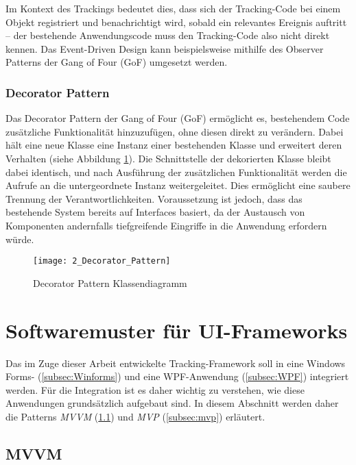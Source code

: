 Im Kontext des Trackings bedeutet dies, dass sich der Tracking-Code bei einem Objekt registriert und benachrichtigt wird, sobald ein relevantes Ereignis auftritt – der bestehende Anwendungscode muss den Tracking-Code also nicht direkt kennen. Das Event-Driven Design kann beispielsweise mithilfe des Observer Patterns der Gang of Four (GoF) \cite{gamma1995design} umgesetzt werden.

\subsubsection{Decorator Pattern}
\label{subsubsec:decorator_pattern}
Das Decorator Pattern der Gang of Four (GoF) \cite{gamma1995design} ermöglicht es, bestehendem Code zusätzliche Funktionalität hinzuzufügen, ohne diesen direkt zu verändern.  
Dabei hält eine neue Klasse eine Instanz einer bestehenden Klasse und erweitert deren Verhalten (siehe Abbildung \ref{fig:decorator_pattern}). 
Die Schnittstelle der dekorierten Klasse bleibt dabei identisch, und nach Ausführung der zusätzlichen Funktionalität werden die Aufrufe an die untergeordnete Instanz weitergeleitet. Dies ermöglicht eine saubere Trennung der Verantwortlichkeiten. Voraussetzung ist jedoch, dass das bestehende System bereits auf Interfaces basiert, da der Austausch von Komponenten andernfalls tiefgreifende Eingriffe in die Anwendung erfordern würde.

\begin{figure}[H]
\centering
\texttt{[image: 2\_Decorator\_Pattern]}
\caption{Decorator Pattern Klassendiagramm}
\label{fig:decorator_pattern}
\end{figure}

\section{Softwaremuster für UI-Frameworks}
\label{subsec:patterns}

Das im Zuge dieser Arbeit entwickelte Tracking-Framework soll in eine Windows Forms- (\ref{subsec:Winforms}) und eine WPF-Anwendung (\ref{subsec:WPF}) integriert werden. 
Für die Integration ist es daher wichtig zu verstehen, wie diese Anwendungen grundsätzlich aufgebaut sind. 
In diesem Abschnitt werden daher die Patterns \textit{MVVM} (\ref{subsec:mvvm}) und \textit{MVP} (\ref{subsec:mvp}) erläutert.

\subsection{MVVM}
\label{subsec:mvvm}


